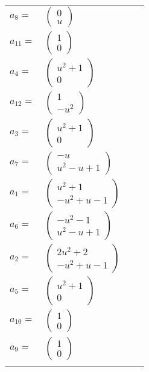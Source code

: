 \documentclass[1p]{elsarticle_modified}
\theoremstyle{definition}
\begin{document}
\begin{tabular}{m{7pt} m{180pt} m{7pt} m{180pt} }
\flushright $a_{8}=$&$\begin{pmatrix}0\\u\end{pmatrix}$ \\
\flushright $a_{11}=$&$\begin{pmatrix}1\\0\end{pmatrix}$ \\
\flushright $a_{4}=$&$\begin{pmatrix}u^2+1\\0\end{pmatrix}$ \\
\flushright $a_{12}=$&$\begin{pmatrix}1\\- u^2\end{pmatrix}$ \\
\flushright $a_{3}=$&$\begin{pmatrix}u^2+1\\0\end{pmatrix}$ \\
\flushright $a_{7}=$&$\begin{pmatrix}- u\\u^2- u+1\end{pmatrix}$ \\
\flushright $a_{1}=$&$\begin{pmatrix}u^2+1\\- u^2+u-1\end{pmatrix}$ \\
\flushright $a_{6}=$&$\begin{pmatrix}- u^2-1\\u^2- u+1\end{pmatrix}$ \\
\flushright $a_{2}=$&$\begin{pmatrix}2 u^2+2\\- u^2+u-1\end{pmatrix}$ \\
\flushright $a_{5}=$&$\begin{pmatrix}u^2+1\\0\end{pmatrix}$ \\
\flushright $a_{10}=$&$\begin{pmatrix}1\\0\end{pmatrix}$ \\
\flushright $a_{9}=$&$\begin{pmatrix}1\\0\end{pmatrix}$\\&\end{tabular}
\end{document}

